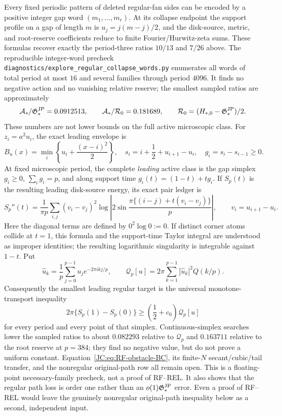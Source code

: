 \begin{contract}
\begin{remark}
\label{JC:rem:RF-collapse-word-audit}
Every fixed periodic pattern of deleted regular-fan sides can be encoded
by a positive integer gap word $(m_1,\ldots,m_r)$.  At its collapse
endpoint the support profile on a gap of length $m$ is
$u_j=j(m-j)/2$, and the disk-source, metric, and root-reserve
coefficients reduce to finite Fourier/Hurwitz-zeta sums.  These formulas
recover exactly the period-three ratios $10/13$ and $7/26$ above.
The reproducible integer-word precheck
\texttt{diagnostics/explore\_regular\_collapse\_words.py} enumerates all
words of total period at most $16$ and several families through period
$4096$.  It finds no negative action and no vanishing relative reserve;
the smallest sampled ratios are approximately
\[
 \mathcal{A}_*/\mathfrak G^{\rm JP}_*=0.0912513,
 \qquad \mathcal{A}_*/\mathcal R_0=0.181689,
 \qquad \mathcal R_0=(H_{*,0}-\mathfrak G^{\rm JP}_*)/2.
\]
These numbers are not lower bounds on the full active microscopic class.
For $z_i=a^2u_i$, the exact leading envelope is
\[
 B_u(x)=\min_i\left\{u_i+\frac{(x-i)^2}{2}\right\},
 \quad s_i=i+\frac12+u_{i+1}-u_i,
 \quad g_i=s_i-s_{i-1}\ge0.
\]
At fixed microscopic period, the complete \emph{leading} active class is
the gap simplex
$g_i\ge0$, $\sum_i g_i=p$, and along support time
$g_i(t)=(1-t)+tg_i$.  If $S_p(t)$ is the resulting leading disk-source
energy, its exact pair ledger is
\[
 S_p''(t)=\frac1{\pi p}\sum_{i,j}(v_i-v_j)^2
 \log\left|2\sin\frac{\pi\{(i-j)+t(v_i-v_j)\}}p\right|,
 \qquad v_i=u_{i+1}-u_i.
\]
Here the diagonal terms are defined by \(0^2\log0:=0\).  If distinct
corner atoms collide at \(t=1\), this formula and the support-time Taylor
integral are understood as improper identities; the resulting logarithmic
singularity is integrable against \(1-t\).
Put
\[
 \widehat u_k=\frac1p\sum_{j=0}^{p-1}u_j e^{-2\pi i k j/p},
 \qquad
 \mathcal Q_p[u]=2\pi\sum_{k=1}^{p-1}
       |\widehat u_k|^2Q(k/p).
\]
Consequently the smallest leading regular target is the universal
monotone-transport inequality
\begin{equation}\label{JC:eq:RF-obstacle-BC}
 2\pi\{S_p(1)-S_p(0)\}
 \ge\left(\frac12+c_0\right)\mathcal Q_p[u]
\end{equation}
for every period and every point of that simplex.  Continuous-simplex
searches lower the sampled ratios to about $0.082293$ relative to
$\mathcal Q_p$ and $0.163711$ relative to the root reserve at $p=384$;
they find no negative value, but do not prove a uniform constant.
Equation~\eqref{JC:eq:RF-obstacle-BC}, its finite-$N$ secant/cubic/tail
transfer, and the nonregular original-path row all remain open.
This is a floating-point necessary-family precheck, not a proof of
RF--REL.  It also shows that the regular path loss is order one rather
than an $o(1)\mathfrak G^{\rm JP}_*$ error.  Even a proof of RF--REL would leave the
genuinely nonregular original-path inequality below as a second,
independent input.
\end{remark}


\end{contract}
